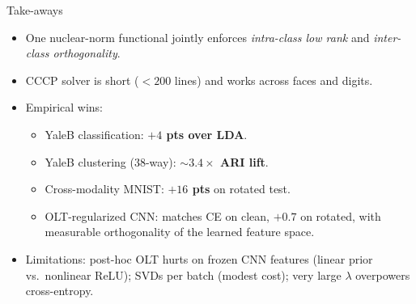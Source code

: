 \documentclass[10pt,aspectratio=169]{beamer}
\begin{document}
\begin{frame}{Take-aways}
\begin{itemize}
\item One nuclear-norm functional jointly enforces \emph{intra-class
low rank} and \emph{inter-class orthogonality}.
\item CCCP solver is short ($<\!200$ lines) and works across faces
and digits.
\item Empirical wins:
\begin{itemize}
\item YaleB classification: \textbf{$+4$ pts over LDA}.
\item YaleB clustering (38-way): \textbf{$\sim\!3.4\!\times$ ARI lift}.
\item Cross-modality MNIST: \textbf{$+16$ pts} on rotated test.
\item OLT-regularized CNN: matches CE on clean, \textbf{$+0.7$} on rotated,
with measurable orthogonality of the learned feature space.
\end{itemize}
\item Limitations: post-hoc OLT hurts on frozen CNN features
(linear prior vs.\ nonlinear ReLU); SVDs per batch (modest cost);
very large $\lambda$ overpowers cross-entropy.
\end{itemize}
\end{frame}
\end{document}
